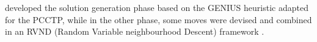 \documentclass{singlecol-new}
\begin{document}
\citet{daSilva} developed the solution generation phase based on the GENIUS heuristic \citep{genius} adapted for the PCCTP, while in the other phase, some moves were devised and combined in an RVND (Random Variable neighbourhood Descent) framework \citep{mladenovic97}.







\end{document}

